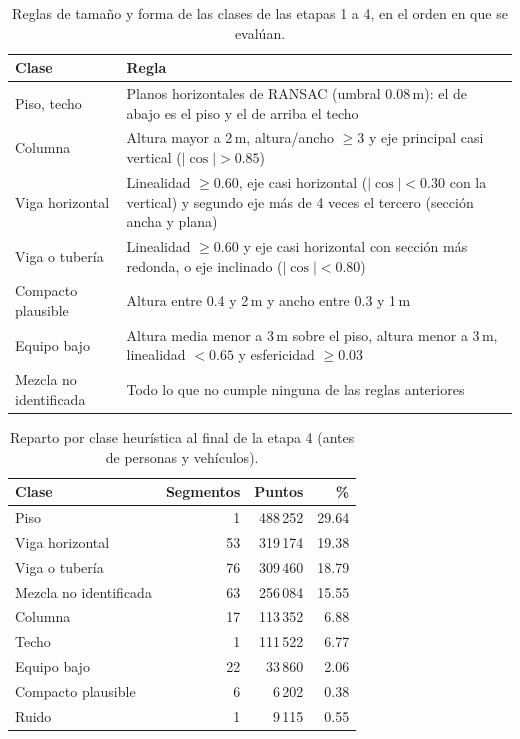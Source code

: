 \documentclass[10pt,a4paper]{article}
\begin{document}
\begin{table}[H]
\centering
\caption{Reglas de tamaño y forma de las clases de las etapas 1 a 4, en el orden en que se evalúan.}
\label{tab:reglas}
\small
\begin{tabular}{lp{11.2cm}}
\toprule
Clase & Regla \\
\midrule
Piso, techo & Planos horizontales de RANSAC (umbral 0.08\,m): el de abajo es el piso y el de arriba el techo \\
Columna & Altura mayor a 2\,m, altura/ancho $\ge 3$ y eje principal casi vertical ($|\cos|>0.85$) \\
Viga horizontal & Linealidad $\ge 0.60$, eje casi horizontal ($|\cos|<0.30$ con la vertical) y segundo eje más de 4 veces el tercero (sección ancha y plana) \\
Viga o tubería & Linealidad $\ge 0.60$ y eje casi horizontal con sección más redonda, o eje inclinado ($|\cos|<0.80$) \\
Compacto plausible & Altura entre 0.4 y 2\,m y ancho entre 0.3 y 1\,m \\
Equipo bajo & Altura media menor a 3\,m sobre el piso, altura menor a 3\,m, linealidad $<0.65$ y esfericidad $\ge 0.03$ \\
Mezcla no identificada & Todo lo que no cumple ninguna de las reglas anteriores \\
\bottomrule
\end{tabular}
\end{table}

\begin{table}[H]
\centering
\caption{Reparto por clase heurística al final de la etapa 4 (antes de personas y vehículos).}
\label{tab:clases}
\begin{tabular}{lrrr}
\toprule
Clase & Segmentos & Puntos & \% \\
\midrule
Piso & 1 & 488\,252 & 29.64 \\
Viga horizontal & 53 & 319\,174 & 19.38 \\
Viga o tubería & 76 & 309\,460 & 18.79 \\
Mezcla no identificada & 63 & 256\,084 & 15.55 \\
Columna & 17 & 113\,352 & 6.88 \\
Techo & 1 & 111\,522 & 6.77 \\
Equipo bajo & 22 & 33\,860 & 2.06 \\
Compacto plausible & 6 & 6\,202 & 0.38 \\
Ruido & 1 & 9\,115 & 0.55 \\
\bottomrule
\end{tabular}
\end{table}
\end{document}

